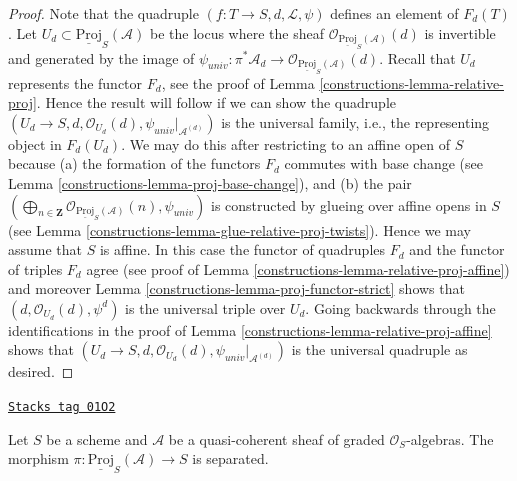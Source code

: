 \begin{proof}

Note that the quadruple $(f : T \to S, d, \mathcal{L}, \psi)$
defines an element of $F_d(T)$. Let
$U_d \subset \underline{\text{Proj}}_S(\mathcal{A})$
be the locus
where the sheaf $\mathcal{O}_{\underline{\text{Proj}}_S(\mathcal{A})}(d)$
is invertible and generated by the image of
$\psi_{univ} : \pi^*\mathcal{A}_d \to
\mathcal{O}_{\underline{\text{Proj}}_S(\mathcal{A})}(d)$.
Recall that $U_d$ represents the functor $F_d$, see the proof
of Lemma \ref{constructions-lemma-relative-proj}. Hence the result will follow
if we can show the quadruple
$(U_d \to S, d, \mathcal{O}_{U_d}(d), \psi_{univ}|_{\mathcal{A}^{(d)}})$
is the universal family, i.e., the representing object in $F_d(U_d)$.
We may do this after restricting to an affine open of $S$ because
(a) the formation of the functors $F_d$ commutes with base change
(see Lemma \ref{constructions-lemma-proj-base-change}), and (b) the pair
$(\bigoplus_{n \in \mathbf{Z}}
\mathcal{O}_{\underline{\text{Proj}}_S(\mathcal{A})}(n),
\psi_{univ})$
is constructed by glueing over affine opens in $S$
(see Lemma \ref{constructions-lemma-glue-relative-proj-twists}).
Hence we may assume that $S$ is affine. In this case the functor
of quadruples $F_d$ and the functor of triples $F_d$ agree
(see proof of Lemma \ref{constructions-lemma-relative-proj-affine}) and moreover
Lemma \ref{constructions-lemma-proj-functor-strict}
shows that $(d, \mathcal{O}_{U_d}(d), \psi^d)$
is the universal triple over $U_d$.
Going backwards through the identifications in the proof of
Lemma \ref{constructions-lemma-relative-proj-affine} shows that
$(U_d \to S, d, \mathcal{O}_{U_d}(d), \psi_{univ}|_{\mathcal{A}^{(d)}})$
is the universal quadruple as desired.
\end{proof}

\begin{lemma}
\label{constructions-lemma-relative-proj-separated}
\href{https://stacks.math.columbia.edu/tag/01O2}{\texttt{Stacks tag 01O2}}

Let $S$ be a scheme and $\mathcal{A}$ be a quasi-coherent sheaf
of graded $\mathcal{O}_S$-algebras. The morphism
$\pi : \underline{\text{Proj}}_S(\mathcal{A}) \to S$
is separated.
\end{lemma}

